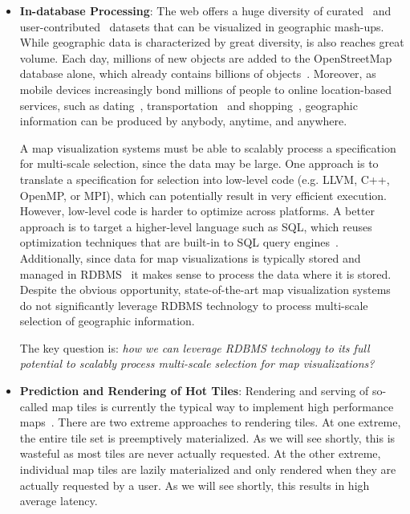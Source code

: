 \documentclass[11pt, oneside]{report}
\begin{document}
\begin{itemize}
\item \textbf{In-database Processing}: The web offers a huge diversity of curated~\cite{gst2014digitalmapsupply} and user-contributed~\cite{openstreetmap, zooniverse2014oldweather} datasets that can be visualized in geographic mash-ups. While geographic data is characterized by great diversity, is also reaches great volume. Each day, millions of new objects are added to the OpenStreetMap database alone, which already contains billions of objects~\cite{openstreetmap2014stats}. Moreover, as mobile devices increasingly bond millions of people to online location-based services, such as dating~\cite{tinder2014tinder}, transportation~\cite{drivr2014drivr} and shopping~\cite{}, geographic information can be produced by anybody, anytime, and anywhere.

A map visualization systems must be able to scalably process a specification for multi-scale selection, since the data may be large. One approach is to translate a specification for selection into low-level code (e.g. LLVM, C++, OpenMP, or MPI), which can potentially result in very efficient execution. However, low-level code is harder to optimize across platforms. A better approach is to target a higher-level language such as SQL, which reuses optimization techniques that are built-in to SQL query engines~\cite{boncz2005pathfinder, boncz2006monetdb, grust2009ferry}. Additionally, since data for map visualizations is typically stored and managed in RDBMS~\cite{wu2014case} it makes sense to process the data where it is stored. Despite the obvious opportunity, state-of-the-art map visualization systems do not significantly leverage RDBMS technology to process multi-scale selection of geographic information.

The key question is: \emph{how we can leverage RDBMS technology to its full potential to scalably process multi-scale selection for map visualizations?}

\item \textbf{Prediction and Rendering of Hot Tiles}: 
Rendering and serving of so-called map tiles is currently the typical way to implement high performance maps~\cite{}. There are two extreme approaches to rendering tiles. At one extreme, the entire tile set is preemptively materialized. As we will see shortly, this is wasteful as most tiles are never actually requested. At the other extreme, individual map tiles are lazily materialized and only rendered when they are actually requested by a user. As we will see shortly, this results in high average latency.


\end{itemize}
\end{document}
